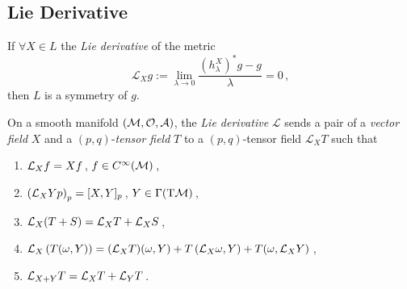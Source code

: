     \subsection{Lie Derivative}
    If $\forall X \in L$ the \textit{Lie derivative} of the metric
    \begin{equation}
        \mathcal{L}_X g:= \lim_{\lambda \to 0}
        \frac{(h^X_\lambda)^* g - g}{\lambda} =0\,,
    \end{equation}
    then $L$ is a symmetry of $g$.

    \begin{defn}
        On a smooth manifold $(\mathcal{M}, \mathcal{O},\mathcal{A})$, the \textit{Lie derivative}
        $\mathcal{L}$ sends a pair of a \textit{vector field} $X$ and a
        $(p,q)$-\textit{tensor field} $T$ to a $(p,q)$-tensor field 
        $\mathcal{L}_X T$ such that
        \begin{enumerate}
            \item $\mathcal{L}_X f = X f$\,, $f\in C^\infty(\mathcal{M})$\,,
            \item $\left(\mathcal{L}_X Yp\right)_p = [X,Y]_p$\,, $Y\in \Gamma(\T\M)$\,,
            \item $\mathcal{L}_X(T+S) = \mathcal{L}_X T + \mathcal{L}_X S$\,,
            \item $\mathcal{L}_X\left(T(\omega, Y)\right) = (\mathcal{L}_X T) (\omega, Y) +
                T\left( \mathcal{L}_X \omega, Y \right) + T(\omega, \mathcal{L}_X Y)$\,,
            \item $\mathcal{L}_{X+Y}T = \mathcal{L}_X T + \mathcal{L}_Y T$\,.
        \end{enumerate}
    \end{defn}

